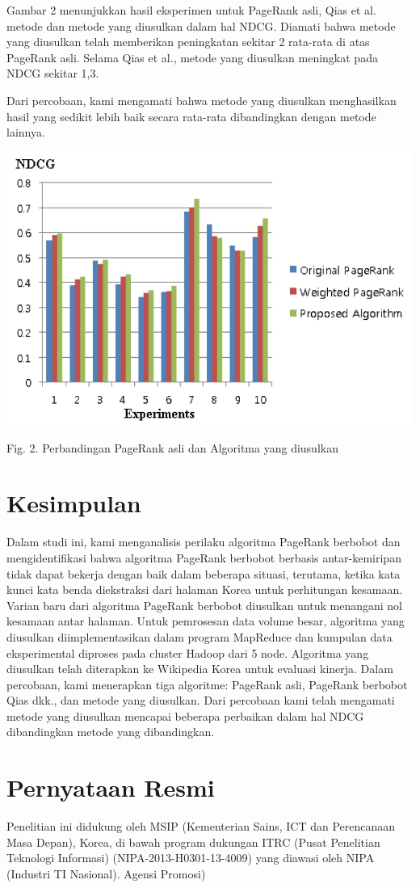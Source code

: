 \documentclass[conference]{IEEEtran}
\begin{document}
Gambar 2 menunjukkan hasil eksperimen untuk PageRank asli, Qias et al.\cite{qiao2010simrank} metode dan metode yang diusulkan dalam hal NDCG.
Diamati bahwa metode yang diusulkan telah memberikan peningkatan sekitar 2 rata-rata di atas PageRank asli. Selama Qias et al.\cite{qiao2010simrank}, metode yang diusulkan meningkat pada NDCG sekitar 1,3.

Dari percobaan, kami mengamati bahwa metode yang diusulkan menghasilkan hasil yang sedikit lebih baik secara rata-rata dibandingkan dengan metode lainnya.
\begin{center}
    \includegraphics[scale=0.46]{graph}

Fig. 2. Perbandingan PageRank asli dan Algoritma yang diusulkan
\end{center}
\section{Kesimpulan}

Dalam studi ini, kami menganalisis perilaku algoritma PageRank berbobot dan mengidentifikasi bahwa algoritma PageRank berbobot berbasis antar-kemiripan tidak dapat bekerja dengan baik dalam beberapa situasi, terutama, ketika kata kunci kata benda diekstraksi dari halaman Korea untuk perhitungan kesamaan.
Varian baru dari algoritma PageRank berbobot diusulkan untuk menangani nol kesamaan antar halaman. Untuk pemrosesan data volume besar, algoritma yang diusulkan diimplementasikan dalam program MapReduce dan kumpulan data eksperimental diproses pada cluster Hadoop dari 5 node.
Algoritma yang diusulkan telah diterapkan ke Wikipedia Korea untuk evaluasi kinerja. Dalam percobaan, kami menerapkan tiga algoritme: PageRank asli, PageRank berbobot Qias dkk.\cite{qiao2010simrank}, dan metode yang diusulkan.
Dari percobaan kami telah mengamati metode yang diusulkan mencapai beberapa perbaikan dalam hal NDCG dibandingkan metode yang dibandingkan.

\section{Pernyataan Resmi}
Penelitian ini didukung oleh MSIP (Kementerian Sains, ICT dan Perencanaan Masa Depan), Korea, di bawah program dukungan ITRC (Pusat Penelitian Teknologi Informasi) (NIPA-2013-H0301-13-4009) yang diawasi oleh NIPA (Industri TI Nasional). Agensi Promosi)



\end{document}

